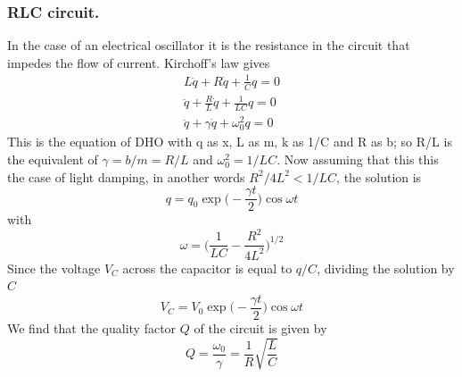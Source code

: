 \documentclass[../../../main.tex]{subfiles}
\begin{document}
\subsubsection{RLC circuit.} In the case of an electrical oscillator it is the resistance in the circuit that impedes the flow of current. Kirchoff's law gives
\begin{align*}
    L\ddot{q}+R\dot{q}+\frac{1}{C}q=0\\
    \ddot{q}+\frac{R}{L}\dot{q}+\frac{1}{LC}q=0\\
    \ddot{q}+\gamma\dot{q}+\omega_0^2q=0
\end{align*}    
This is the equation of DHO with q as x, L as m, k as 1/C and R as b; so R/L is the equivalent of $\gamma=b/m=R/L$ and $\omega_0^2=1/LC$. Now assuming that this this the case of light damping, in another words $ R^2/4L^2<1/LC$, the solution is
\begin{equation*}
    q=q_0\exp\biggl(-\frac{\gamma t}{2}\biggr)\cos\omega t
\end{equation*} 
with\begin{equation*}
    \omega =\biggl(\frac{1}{LC}-\frac{R^2}{4L^2}\biggr)^{1/2}
\end{equation*}Since the voltage $V_C$ across the capacitor is equal to $q/C$, dividing the solution by $C$\begin{equation*}
    V_C=V_0\exp\biggl(-\frac{\gamma t}{2}\biggr)\cos\omega t
\end{equation*}
We find that the quality factor $Q$ of the circuit is given by
\begin{equation*}
    Q=\frac{\omega_0}{\gamma}=  \frac{1}{R}\sqrt{\frac{L}{C}}
\end{equation*}
\end{document}
